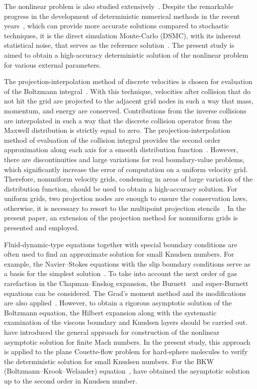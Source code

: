 \documentclass[review]{elsarticle}
\begin{document}
The nonlinear problem is also studied extensively~\citep{Garzo2003}.
Despite the remarkable progress in the development of deterministic numerical methods
in the recent years~\citep[see e.g.][]{Dimarco2014,Mieussens2014},
which can provide more accurate solutions compared to stochastic techniques,
it is the direct simulation Monte-Carlo (DSMC), with its inherent statistical noise,
that serves as the reference solution~\citep[see e.g.][]{Cercignani1994,Struchtrup2009,Agrawal2014}.
The present study is aimed to obtain a high-accuracy deterministic solution
of the nonlinear problem for various external parameters.

The projection-interpolation method of discrete velocities is chosen for
evaluation of the Boltzmann integral~\citep{Tcheremissine1998, Tcheremissine2006}.
With this technique, velocities after collision that do not hit the grid
are projected to the adjacent grid nodes in such a way that mass, momentum, and energy are conserved.
Contributions from the inverse collisions are interpolated in such a way that
the discrete collision operator from the Maxwell distribution is strictly equal to zero.
The projection-interpolation method of evaluation of the collision integral
provides the second order approximation along each axis for a smooth distribution function~\citep{Anikin2012}.
However, there are discontinuities and large variations for real boundary-value problems,
which significantly increase the error of computation on a uniform velocity grid.
Therefore, nonuniform velocity grids, condensing in areas of large variation
of the distribution function, should be used to obtain a high-accuracy solution.
For uniform grids, two projection nodes are enough to ensure the conservation laws,
otherwise, it is necessary to resort to the multipoint projection stencils~\citep{Dodulad2012}.
In the present paper, an extension of the projection method for nonuniform grids is presented and employed.

Fluid-dynamic-type equations together with special boundary conditions
are often used to find an approximate solution for small Knudsen numbers.
For example, the Navier--Stokes equations with the slip boundary conditions
serve as a basis for the simplest solution~\citep{Sharipov2000}.
To take into account the next order of gas rarefaction in the Chapman--Enskog expansion,
the Burnett~\citep{Reese2003} and super-Burnett~\citep{Agrawal2014} equations can be considered.
The Grad's moment method and its modifications are also applied~\citep{Struchtrup2009}.
However, to obtain a rigorous asymptotic solution of the Boltzmann equation,
the Hilbert expansion along with the systematic examination of the viscous boundary and Knudsen layers
should be carried out. \citet{Sone2000} have introduced the general approach
for construction of the nonlinear asymptotic solution for finite Mach numbers.
In the present study, this approach is applied to the plane Couette-flow problem for hard-sphere molecules
to verify the deterministic solution for small Knudsen numbers.
For the BKW (Boltzmann--Krook--Welander) equation~\citep{Krook1954,Welander1954},
\citet{Sone1970} have obtained the asymptotic solution up to the second order in Knudsen number.
\end{document}
